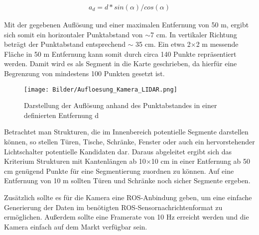 \begin{align}
	a_d= d*sin(\alpha)/cos(\alpha)
\end{align}

Mit der gegebenen Auflösung und einer maximalen Entfernung von 50 m, ergibt sich somit ein horizontaler Punktabstand von $\sim$7 cm. In vertikaler Richtung beträgt der Punktabstand entsprechend $\sim$ 35 cm. Ein etwa 2$\times$2 m messende Fläche in 50 m Entfernung kann somit durch circa 140 Punkte repräsentiert werden. Damit wird es als Segment in die Karte geschrieben, da hierfür eine Begrenzung von mindestens 100 Punkten gesetzt ist. 

\begin{figure}
	\centering
	\texttt{[image: Bilder/Aufloesung\_Kamera\_LIDAR.png]}
	\caption{Darstellung der Auflösung anhand des Punktabstandes in einer definierten Entfernung d}
	\label{fig:Auflösung}
\end{figure}

Betrachtet man Strukturen, die im Innenbereich potentielle Segmente darstellen können, so stellen Türen, Tische, Schränke, Fenster oder auch ein hervorstehender Lichtschalter potentielle Kandidaten dar. Daraus abgeleitet ergibt sich das Kriterium Strukturen mit Kantenlängen ab 10$\times$10 cm in einer Entfernung ab 50 cm genügend Punkte für eine Segmentierung zuordnen zu können. Auf eine Entfernung von 10 m sollten Türen und Schränke noch sicher Segmente ergeben. 

Zusätzlich sollte es für die Kamera eine ROS-Anbindung geben, um eine einfache Generierung der Daten im benötigten ROS-Sensornachrichtenformat zu ermöglichen. Außerdem sollte eine Framerate von 10 Hz erreicht werden und die Kamera einfach auf dem Markt verfügbar sein. 


